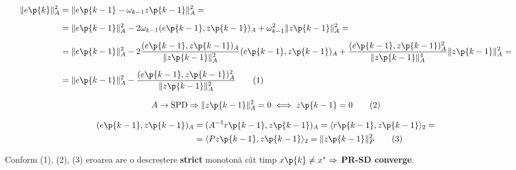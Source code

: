 \begin{demonstratie}
    \begin{align*}
        \| e\p{k} \|_A^2 &= \| e\p{k-1} - \omega_{k-1} z\p{k-1} \|_A^2 = \\[0.5em]
        &= \| e\p{k-1} \|_A^2 - 2 \omega_{k-1} (e\p{k-1}, z\p{k-1})_A + \omega_{k-1}^2 \| z\p{k-1} \|_A^2 = \\[0.5em]
        &= \| e\p{k-1} \|_A^2 - 2 \frac{(e\p{k-1}, z\p{k-1})_A}{\| z\p{k-1} \|_A^2} (e\p{k-1}, z\p{k-1})_A + \frac{(e\p{k-1}, z\p{k-1})_A^2}{\| z\p{k-1} \|_A^4} \| z\p{k-1} \|_A^2 = \\[0.5em]
        &= \| e\p{k-1} \|_A^2 - \frac{(e\p{k-1}, z\p{k-1})_A^2}{\| z\p{k-1} \|_A^2} \tag{1}
    \end{align*}

    \[
    A \rightarrow \text{SPD} \Rightarrow \| z\p{k-1} \|_A^2 = 0 \iff z\p{k-1} = 0 \tag{2}
    \]

    \begin{align*}
        (e\p{k-1}, z\p{k-1})_A &= (A^{-1} r\p{k-1}, z\p{k-1})_A = \langle r\p{k-1}, z\p{k-1} \rangle_2 = \\
        &= \langle P z\p{k-1}, z\p{k-1} \rangle_2 = \| z\p{k-1} \|^2_{P} \tag{3}
    \end{align*}

    \bigskip

    Conform (1), (2), (3) eroarea are o descreștere \textbf{strict} monotonă cât timp $x\p{k} \neq x^\ast \Rightarrow$ \textbf{PR-SD converge}. 
\end{demonstratie}